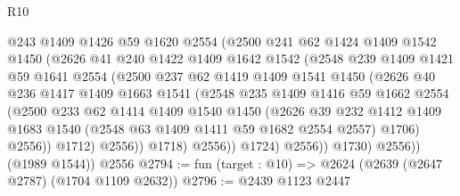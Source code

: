 \begin{lexlean}{R10}
\begin{coremodule}
                    @243
                    @1409
                    @1426
                    @59
                    @1620
                    @2554
                    (@2500
                      @241
                      @62
                      @1424
                      @1409
                      @1542
                      @1450
                      (@2626
                        @41
                        @240
                        @1422
                        @1409
                        @1642
                        @1542
                        (@2548
                          @239
                          @1409
                          @1421
                          @59
                          @1641
                          @2554
                          (@2500
                            @237
                            @62
                            @1419
                            @1409
                            @1541
                            @1450
                            (@2626
                              @40
                              @236
                              @1417
                              @1409
                              @1663
                              @1541
                              (@2548
                                @235
                                @1409
                                @1416
                                @59
                                @1662
                                @2554
                                (@2500
                                  @233
                                  @62
                                  @1414
                                  @1409
                                  @1540
                                  @1450
                                  (@2626
                                    @39
                                    @232
                                    @1412
                                    @1409
                                    @1683
                                    @1540
                                    (@2548 @63 @1409 @1411 @59 @1682 @2554 @2557)
                                    @1706)
                                  @2556))
                              @1712)
                            @2556))
                        @1718)
                      @2556))
                  @1724)
                @2556))
            @1730)
          @2556))
      (@1989 @1544))
    @2556
@2794 := fun (target : @10) => @2624 (@2639 (@2647 @2787) (@1704 @1109 @2632))
@2796 := @2439 @1123 @2447

\end{coremodule}
\end{lexlean}
